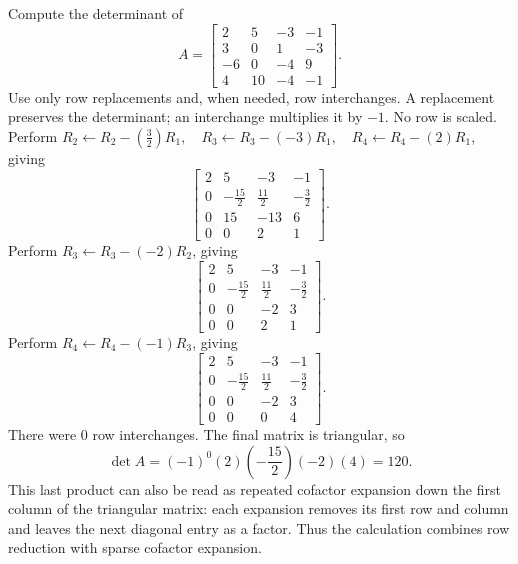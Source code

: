 \goal Compute the determinant of
\[A=\begin{bmatrix}2&5&-3&-1\\3&0&1&-3\\-6&0&-4&9\\4&10&-4&-1\end{bmatrix}.\]
Use only row replacements and, when needed, row interchanges. A replacement preserves the determinant; an interchange multiplies it by $-1$. No row is scaled.
Perform $R_2\leftarrow R_2-(\frac{3}{2})R_1,\quad R_3\leftarrow R_3-(-3)R_1,\quad R_4\leftarrow R_4-(2)R_1$, giving
\[
\begin{bmatrix}2&5&-3&-1\\0&- \frac{15}{2}&\frac{11}{2}&- \frac{3}{2}\\0&15&-13&6\\0&0&2&1\end{bmatrix}.
\]
Perform $R_3\leftarrow R_3-(-2)R_2$, giving
\[
\begin{bmatrix}2&5&-3&-1\\0&- \frac{15}{2}&\frac{11}{2}&- \frac{3}{2}\\0&0&-2&3\\0&0&2&1\end{bmatrix}.
\]
Perform $R_4\leftarrow R_4-(-1)R_3$, giving
\[
\begin{bmatrix}2&5&-3&-1\\0&- \frac{15}{2}&\frac{11}{2}&- \frac{3}{2}\\0&0&-2&3\\0&0&0&4\end{bmatrix}.
\]
There were $0$ row interchanges. The final matrix is triangular, so
\[\det A=(-1)^{0}(2)(- \frac{15}{2})(-2)(4)=120.\]
This last product can also be read as repeated cofactor expansion down the first column of the triangular matrix: each expansion removes its first row and column and leaves the next diagonal entry as a factor. Thus the calculation combines row reduction with sparse cofactor expansion.


